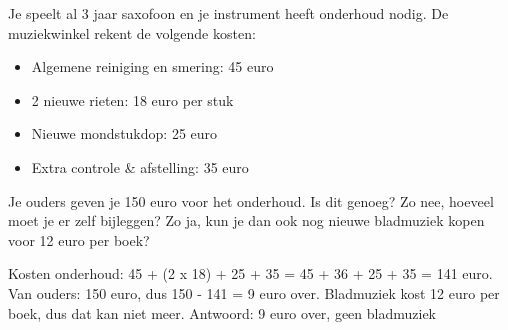 \begin{opgave}
Je speelt al 3 jaar saxofoon en je instrument heeft onderhoud nodig. De muziekwinkel rekent
de volgende kosten:

\begin{itemize}
\item Algemene reiniging en smering: 45 euro
\item 2 nieuwe rieten: 18 euro per stuk
\item Nieuwe mondstukdop: 25 euro
\item Extra controle \& afstelling: 35 euro
\end{itemize}

Je ouders geven je 150 euro voor het onderhoud. Is dit genoeg? Zo nee, hoeveel moet je er
zelf bijleggen? Zo ja, kun je dan ook nog nieuwe bladmuziek kopen voor 12 euro per boek?
\end{opgave}

\begin{oplossing}
Kosten onderhoud: 45 + (2 x 18) + 25 + 35 = 45 + 36 + 25 + 35 = 141 euro.
Van ouders: 150 euro, dus 150 - 141 = 9 euro over.
Bladmuziek kost 12 euro per boek, dus dat kan niet meer.
Antwoord: 9 euro over, geen bladmuziek
\end{oplossing}
